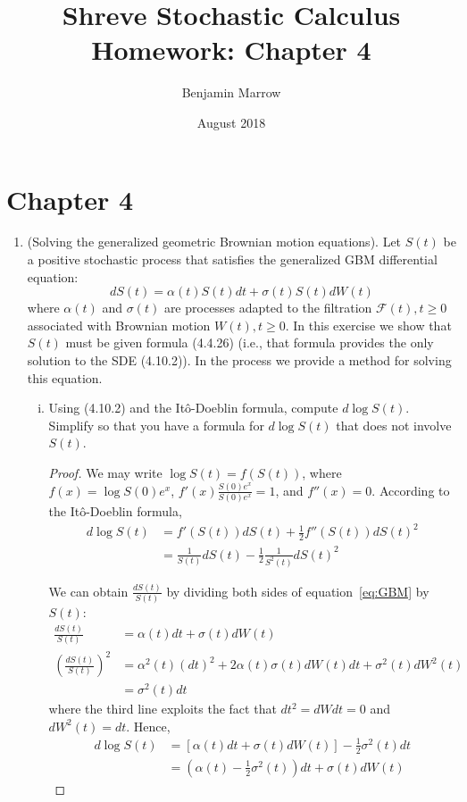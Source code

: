 \documentclass{article}
\title{Shreve Stochastic Calculus Homework: Chapter 4 \vspace{-1eX}}
\author{Benjamin Marrow \vspace{-1.5eX}}
\date{ August 2018  \vspace{-1eX}}
\makeatletter
\newcommand{\F}{\mathcal{F}}
\newcommand{\mylabel}[2]{#2\def\@currentlabel{#2}\label{#1}}
\newcommand{\pr}[1]{ \item[\mylabel{}{#1.}]}
\theoremstyle{definition}
\theoremstyle{definition}
\makeatother
\begin{document}
\maketitle


\section*{Chapter 4}

\begin{enumerate}
    \pr{4.5} (Solving the generalized geometric Brownian motion equations). Let $S(t)$ be a positive stochastic process that satisfies the generalized GBM differential equation:
\begin{equation} 
     dS(t) = \alpha(t) S(t) dt + \sigma(t) S(t) dW(t) \tag{4.10.2}\label{eq:GBM}
\end{equation}
    where $\alpha(t)$ and $\sigma(t)$ are processes adapted to the filtration $\F(t), t \geq 0$ associated with Brownian motion $W(t), t \geq 0$. In this exercise we show that $S(t) $ must be given formula (4.4.26) (i.e., that formula provides the only solution to the SDE (4.10.2)). In the process we provide a method for solving this equation.
    \begin{enumerate}[(i)]
        \item Using (4.10.2) and the It\^{o}-Doeblin formula, compute $d \log S(t)$. Simplify so that you have a formula for $d \log S(t)$ that does not involve $S(t)$.
        
        \begin{proof} We may write $\log S(t) = f(S(t))$, where $f(x) = \log S(0)e^x$, $f'(x) \frac{S(0)e^x}{S(0)e^x}=1$, and $f''(x) = 0$. According to the It\^{o}-Doeblin formula, 
        \begin{align*}
            d \log S(t) &= f'(S(t))dS(t) + \frac{1}{2}f''(S(t))dS(t)^2 \\
            &= \frac{1}{S(t)} dS(t) -\frac{1}{2}\frac{1}{S^2(t)} dS(t)^2 
        \end{align*}
        
        We can obtain $\frac{dS(t)}{S(t)}$ by dividing both sides of equation~\ref{eq:GBM} by $S(t)$:
        \begin{align*}
            \frac{dS(t)}{S(t)} & = \alpha(t) dt + \sigma(t) dW(t) \\
            \left( \frac{dS(t)}{S(t)}\right)^2 &= \alpha^2(t)(dt)^2+ 2\alpha(t)\sigma(t)dW(t)dt +\sigma^2(t)dW^2(t) \\
            & = \sigma^2(t)dt
        \end{align*}
        where the third line exploits the fact that $dt^2 = dWdt = 0$ and $dW^2(t)=dt$.
        Hence,
        \begin{align*}
            d \log S(t) &= \left[ \alpha(t) dt + \sigma(t) dW(t) \right] - \frac{1}{2}\sigma^2(t)dt \\
                        &= \left( \alpha(t)  - \frac{1}{2}\sigma^2(t) \right) dt+  \sigma(t)   dW(t)
        \end{align*} \end{proof}
        

\end{enumerate}
\end{enumerate}
\end{document}
